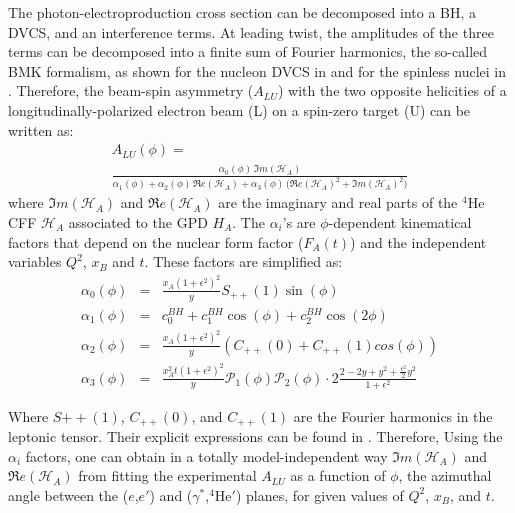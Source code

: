 \documentclass[nofootinbib,twocolumn,showpacs,prl,superscriptaddress,secnumarabic,amssymb,nobibnotes,aps,floatfix]{revtex4}
\begin{document}
The photon-electroproduction cross section can be decomposed into a BH,
a DVCS, and an interference terms. At leading twist, the amplitudes of the 
three terms can be decomposed into a finite sum of Fourier harmonics, the 
so-called BMK formalism, as shown for the nucleon DVCS in 
\cite{Belitsky:2001ns} and for the spinless nuclei in 
\cite{Kirchner:2003wt,Belitsky:2008bz}. Therefore, the beam-spin asymmetry 
($A_{LU}$) with the two opposite helicities of a longitudinally-polarized 
electron beam (L) on a spin-zero target (U) can be written as:
\small
\begin{equation}
\begin{split}
A_{LU}(\phi) =~~~~~~~~~~~~~~~~~~~~~~~~~~~~~~~~~~~~~~~~~~~~~~~~~~~~~~~~~\\
 \frac{\alpha_{0}(\phi) \, \Im m(\mathcal{H}_{A})}
{\alpha_{1}(\phi) + \alpha_{2}(\phi) \, \Re e(\mathcal{H}_{A}) + \alpha_{3}(\phi) \, 
\big( 
\Re e(\mathcal{H}_{A})^{2} + \Im m(\mathcal{H}_{A})^{2} \big)}
\label{eq:A_LU-coh}
\end{split}
\end{equation}
\normalsize
where $\Im m(\mathcal{H}_{A})$ and $\Re e(\mathcal{H}_{A})$ are the imaginary 
and real parts of the $^4$He CFF $\mathcal{H}_{A}$ associated to the GPD $H_A$.  
The $\alpha_{i}$'s are $\phi$-dependent kinematical factors that depend on the 
nuclear form factor ($F_{A}(t)$) and the independent variables $Q^2$, $x_{B}$ 
and $t$. These factors are simplified as:
\small
\begin{eqnarray}
   \alpha_0 (\phi) & = &\frac{x_{A}(1+\epsilon^2)^2}{y} S_{++}(1) \sin(\phi)\\
    \alpha_1 (\phi) & = & c_0^{BH}+c_1^{BH} \cos({\phi})+c_2^{BH} \cos(2\phi)\\ 
   \alpha_2 (\phi) & = & \frac{x_{A}(1+\epsilon^2)^2}{y}  \left( C_{++}(0) +  
C_{++}(1) cos(\phi) \right)\\
\alpha_3 (\phi) &=& \frac{x^{2}_{A}t(1+\epsilon^2)^2}{y} {\mathcal P}_1(\phi) 
{\mathcal P}_2(\phi) \cdot 2 \frac{2-2y+y^2 + \frac{\epsilon^2}{2}y^2}{1 + 
\epsilon^2}
\end{eqnarray}
\normalsize

Where $S{++}(1)$, $C_{++}(0)$, and $C_{++}(1)$ are the Fourier harmonics in the 
leptonic tensor. Their explicit expressions can be found in 
\cite{Belitsky:2008bz}. Therefore, Using the $\alpha_{i}$ factors, one can 
obtain in a totally model-independent way $\Im m(\mathcal{H}_{A})$ and $\Re 
e(\mathcal{H}_{A})$ from fitting the experimental $A_{LU}$ as a function of 
$\phi$, the azimuthal angle between the ($e$,$e'$) and ($\gamma^{*}$,$^4$He$'$) 
planes, for given values of $Q^2$, $x_{B}$, and $t$.
\end{document}
